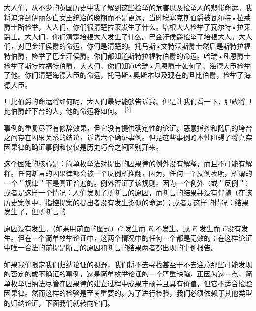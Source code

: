 大人们，从不少的英国历史中我了解到这些检举的危害以及检举人的悲惨命运。我将追溯到伊丽莎白女王统治的晚期而不是更远，当时埃塞克斯伯爵被瓦尔特•拉莱爵士所检举，大人们，你们很清楚拉莱发生了什么。培根大人检举了瓦尔特•拉莱爵士。大人们，你们清楚培根大人发生了什么。巴金汗侯爵检举了培根大人。大人们，对巴金汗侯爵的命运，你们是清楚的。托马斯•文特沃斯爵士然后是斯特拉福特伯爵，检举了巴金汗侯爵。你们都知道斯特拉福特伯爵的命运。哈瑞•凡恩爵士检举了斯特拉福特伯爵，大人们，你们知道哈瑞•凡恩爵士如何了，海德大臣检举了他。你们清楚海德大臣的命运，托马斯•奥斯本以及现在的旦比伯爵，检举了海德大臣。

旦比伯爵的命运将如何呢，大人们最好能够告诉我。但是让我们看一下，胆敢将旦比伯爵赶下台的人，他的命运将如何。 ${ }^{[5]}$

事例的重复尽管有修辞效果，但它没有提供确定性的论证。恶意指控和随后的垮台之间存在因果关系的结论，诉诸六个确证事例。但是这些事例的本性阻碍了将真实因果律的确证事例和仅仅是历史巧合之间区别开来。

这个困难的核心是：简单枚举法对提出的因果律的例外没有解释，而且不可能有解释。任何断言的因果律都会被一个反例所推翻，因为，任何一个反例表明，所谓的一个＂规律＂不是真正普遍的。例外否证了该规则。因为一个例外（或＂反例＂）或者是这样一个情况：人们发现了所断言的原因，而断言的结果并没有伴随（在该历史案例中，指控提案的提出者没有发生类似的命运）；或者是这样的情况：结果发生了，但所断言的

原因没有发生。（如果用前面的图式）$C$ 发生而 $E$ 不发生，或 $E$ 发生而 $C$没有发生。但在一个简单枚举论证中，这两个情况中的任何一个都是无效的；在这样论证中唯一合法的前提是断言的原因和断言的结果两者都出现的事例报告。

如果我们限定我们归纳论证的视野，我们将不去寻找甚至于不去注意那些可能发现的否定的或不确证的事例，这是简单枚举论证的一个严重缺陷。正因为这一点，简单枚举归纳法尽管在因果律的建立过程中成果丰硕并且具有价值，但它不适合检验因果律。然而这样的检验是至关重要的。为了进行检验，我们必须依赖于其他类型的归纳论证，下面我们就转向它们。 